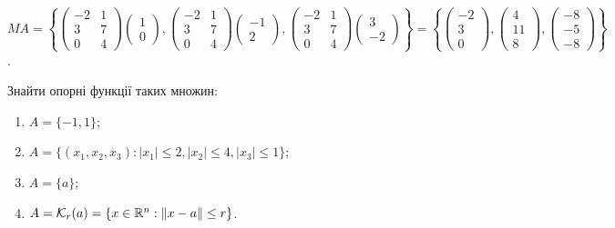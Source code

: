 \begin{solution}
    $MA = \left\{ \begin{pmatrix} -2 & 1 \\ 3 & 7 \\ 0 & 4 \end{pmatrix} \begin{pmatrix} 1 \\ 0 \end{pmatrix}, \begin{pmatrix} -2 & 1 \\ 3 & 7 \\ 0 & 4 \end{pmatrix} \begin{pmatrix} -1 \\ 2 \end{pmatrix}, \begin{pmatrix} -2 & 1 \\ 3 & 7 \\ 0 & 4 \end{pmatrix}  \begin{pmatrix} 3 \\ -2 \end{pmatrix} \right\} = \left\{ \begin{pmatrix} -2 \\ 3 \\ 0 \end{pmatrix}, \begin{pmatrix} 4 \\ 11 \\ 8 \end{pmatrix}, \begin{pmatrix} -8 \\ -5 \\ -8 \end{pmatrix}\right\}$.
\end{solution}

\setcounter{problem}{4}

\begin{problem}
    Знайти опорні функції таких множин:
    \begin{enumerate}
        \item $A = \{ -1, 1 \}$;
        \item $A = \{ (x_1, x_2, x_3) : |x_1| \le 2, |x_2| \le  4, |x_3| \le 1 \}$;
        \item $A = \{ a \}$;
        \item $A = \mathcal{K}_r(a) = \{ x\in \mathbb{R}^n : \| x - a \| \le r \}$.
    \end{enumerate}
\end{problem}

